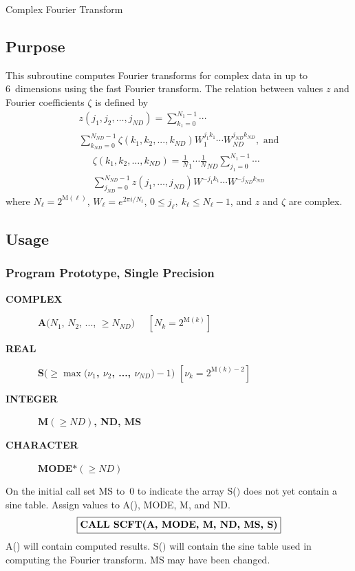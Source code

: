\documentclass[twoside]{MATH77}
\begin{document}
 Complex Fourier Transform


\subsection{Purpose}

This subroutine computes Fourier transforms for complex data in up to
6~dimensions using the fast Fourier transform. The relation between values $z$
and Fourier coefficients $\zeta $ is defined by%
\begin{multline*}
 z(j_1,j_2,\ldots,j_{ND})= \sum_{k_1=0}^{N_1-1} \cdots\\
\sum_{k_{ND}=0}^{N_{ND}-1}
\zeta (k_1,k_2,...,k_{ND})W_1^{j_1k_1} \cdots
W_{ND}^{j_{ND}k_{ND}},\text{ and}
\end{multline*}\vspace{-20pt}
\begin{multline*}
\zeta(k_1,k_2,\ldots,k_{ND})=\frac 1N_1 \cdots \frac 1N_{ND}
\sum_{j_1=0}^{N_1-1} \cdots\\
\sum_{j_{ND}=0}^{N_{ND}-1}
 z(j_1,\ldots,j_{ND}) W^{-j_1k_1} \cdots W^{-j_{ND}k_{ND}}
\end{multline*}
where $N_\ell =2^{\text{M}(\ell)}$, $W_\ell =e^{2\pi i/N_\ell}$, $%
0\leq j_\ell,\ k_\ell \leq N_\ell -1$, and $z$ and $\zeta $ are complex.

\subsection{Usage}

\subsubsection{Program Prototype, Single Precision}

\begin{description}
\item[\bf COMPLEX]  \ {\bf A}$(N_1$, $N_2$, ..., $\geq N_{ND})$
\ \ $[N_k=2^{\text{M}(k)}]$
\item[\bf REAL]  \ {\bf S}$(\geq \max (\nu _1${\bf , $\nu _2$, ..., $\nu
_{ND})-1)$} $[\nu _k=2^{\text{M}(k)-2}]$
\item[\bf INTEGER]  \ {\bf M}$(\geq {\textstyle ND})${\bf , ND, MS}
\item[\bf CHARACTER]  \ {\bf MODE$*(\geq {\textstyle ND})$}
\end{description}
On the initial call set MS to~0 to indicate the array S($)$ does not yet
contain a sine table. Assign values to A(), MODE, M, and ND.
$$
\fbox{{\bf CALL SCFT(A, MODE, M, ND, MS, S)}}
$$
A() will contain computed results. S($)$ will contain the sine table used in
computing the Fourier transform. MS may have been changed.
\end{document}
